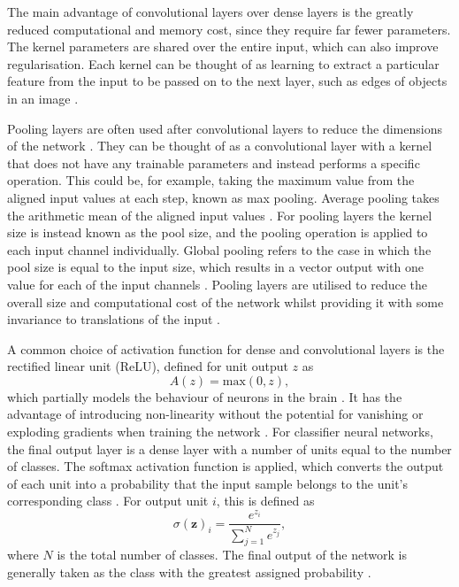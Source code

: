 \documentclass[12pt]{article}
\begin{document}
The main advantage of convolutional layers over dense layers is the greatly reduced computational and memory cost, since they require far fewer parameters. The kernel parameters are shared over the entire input, which can also improve regularisation. Each kernel can be thought of as learning to extract a particular feature from the input to be passed on to the next layer, such as edges of objects in an image \cite{Goodfellow16}.

Pooling layers are often used after convolutional layers to reduce the dimensions of the network \cite{Goodfellow16}. They can be thought of as a convolutional layer with a kernel that does not have any trainable parameters and instead performs a specific operation. This could be, for example, taking the maximum value from the aligned input values at each step, known as max pooling. Average pooling takes the arithmetic mean of the aligned input values \cite{Aghdam17}. For pooling layers the kernel size is instead known as the pool size, and the pooling operation is applied to each input channel individually. Global pooling refers to the case in which the pool size is equal to the input size, which results in a vector output with one value for each of the input channels \cite{Aghdam17}. Pooling layers are utilised to reduce the overall size and computational cost of the network whilst providing it with some invariance to translations of the input \cite{Goodfellow16, Aghdam17}.

A common choice of activation function for dense and convolutional layers is the rectified linear unit (ReLU), defined for unit output $z$ as
\begin{equation}
A(z)=\mathrm{max}(0, z), \label{relu}
\end{equation}
which partially models the behaviour of neurons in the brain \cite{Glorot11}. It has the advantage of introducing non-linearity without the potential for vanishing or exploding gradients when training the network \cite{Goodfellow16, Glorot11}. For classifier neural networks, the final output layer is a dense layer with a number of units equal to the number of classes. The softmax activation function is applied, which converts the output of each unit into a probability that the input sample belongs to the unit's corresponding class \cite{Goodfellow16}. For output unit $i$, this is defined as
\begin{equation}
\sigma(\bm{z})_i=\frac{e^{z_i}}{\sum_{j=1}^Ne^{z_j}}, \label{softmax}
\end{equation}
where $N$ is the total number of classes. The final output of the network is generally taken as the class with the greatest assigned probability \cite{Goodfellow16}.
\end{document}
